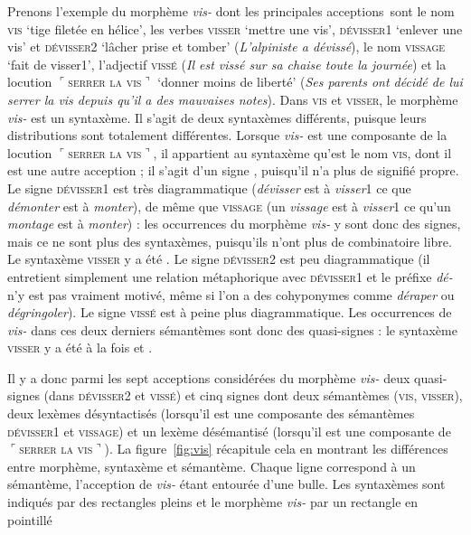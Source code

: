 Prenons l’exemple du morphème \textit{vis-} dont les principales acceptions~sont le nom \textsc{vis} ‘tige filetée en hélice’, les verbes \textsc{visser} ‘mettre une vis’, \textsc{dévisser1} ‘enlever une vis’ et \textsc{dévisser2} ‘lâcher prise et tomber’ (\textit{L’alpiniste a dévissé}), le nom \textsc{vissage} ‘fait de visser1’, l’adjectif \textsc{vissé} (\textit{Il est vissé sur sa chaise toute la journée}) et la locution $⌜$\textsc{serrer} \textsc{la} \textsc{vis}$⌝$ ‘donner moins de liberté’ (\textit{Ses parents ont décidé de lui serrer la vis depuis qu’il a des mauvaises notes}). Dans \textsc{vis} et \textsc{visser}, le morphème \textit{vis-} est un syntaxème. Il s’agit de deux syntaxèmes différents, puisque leurs distributions sont totalement différentes. Lorsque \textit{vis-} est une composante de la locution $⌜$\textsc{serrer} \textsc{la} \textsc{vis}$⌝$, il appartient au syntaxème qu’est le nom \textsc{vis}, dont il est une autre acception ; il s’agit d’un signe , puisqu’il n’a plus de signifié propre. Le signe \textsc{dévisser1} est très diagrammatique (\textit{dévisser} est à \textit{visser}1 ce que \textit{démonter} est à \textit{monter}), de même que \textsc{vissage} (un \textit{vissage} est à \textit{visser}1 ce qu’un \textit{montage} est à \textit{monter}) : les occurrences du morphème \textit{vis-} y sont donc des signes, mais ce ne sont plus des syntaxèmes, puisqu’ils n’ont plus de combinatoire libre. Le syntaxème \textsc{visser} y a été . Le signe \textsc{dévisser2} est peu diagrammatique (il entretient simplement une relation métaphorique avec \textsc{dévisser}1 et le préfixe \textit{dé-} n’y est pas vraiment motivé, même si l’on a des cohyponymes comme \textit{déraper} ou \textit{dégringoler}). Le signe \textsc{vissé} est à peine plus diagrammatique. Les occurrences de \textit{vis-} dans ces deux derniers sémantèmes sont donc des quasi-signes : le syntaxème \textsc{visser} y a été à la fois  et .

Il y a donc parmi les sept acceptions considérées du morphème \textit{vis-} deux quasi-signes (dans \textsc{dévisser2} et \textsc{vissé}) et cinq signes dont deux sémantèmes (\textsc{vis,} \textsc{visser}), deux lexèmes désyntactisés (lorsqu’il est une composante des sémantèmes \textsc{dévisser1} et \textsc{vissage}) et un lexème désémantisé (lorsqu’il est une composante de $⌜$\textsc{serrer} \textsc{la} \textsc{vis}$⌝$).
La figure~\ref{fig:vis} récapitule cela en montrant les différences entre morphème, syntaxème et sémantème. Chaque ligne correspond à un sémantème, l’acception de \textit{vis-} étant entourée d’une bulle. Les syntaxèmes sont indiqués par des rectangles pleins et le morphème \textit{vis-} par un rectangle en pointillé

